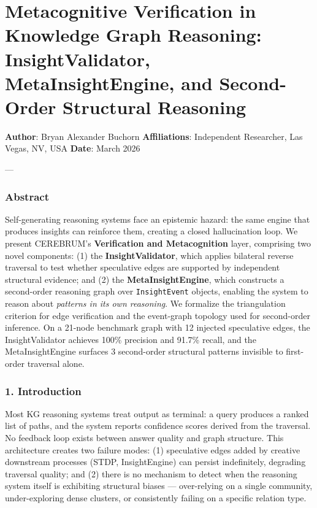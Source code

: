 \section{Metaco\-gnitive Verifi\-cation in Knowledge Graph Reasoning: InsightValidator, MetaInsightEngine, and Second-Order Structural Reasoning}

\textbf{Author}: Bryan Alexander Buchorn
\textbf{Affili\-ations}: Independent Researcher, Las Vegas, NV, USA
\textbf{Date}: March 2026

---

\subsubsection{Abstract}
Self-generating reasoning systems face an epistemic hazard: the same engine that produces insights can reinforce them, creating a closed hallu\-cination loop. We present CEREBRUM's \textbf{Verifi\-cation and Metaco\-gnition} layer, comprising two novel components: (1) the \textbf{InsightValidator}, which applies bilateral reverse traversal to test whether speculative edges are supported by independent structural evidence; and (2) the \textbf{MetaInsightEngine}, which constructs a second-order reasoning graph over \texttt{InsightEvent} objects, enabling the system to reason about \textit{patterns in its own reasoning}. We formalize the trian\-gulation criterion for edge verif\-ication and the event-graph topology used for second-order inference. On a 21-node benchmark graph with 12 injected speculative edges, the InsightValidator achieves 100\% precision and 91.7\% recall, and the MetaInsightEngine surfaces 3 second-order structural patterns invisible to first-order traversal alone.

\subsubsection{1. Introd\-uction}
Most KG reasoning systems treat output as terminal: a query produces a ranked list of paths, and the system reports confidence scores derived from the traversal. No feedback loop exists between answer quality and graph structure. This archi\-tecture creates two failure modes: (1) speculative edges added by creative downstream processes (STDP, InsightEngine) can persist indef\-initely, degrading traversal quality; and (2) there is no mechanism to detect when the reasoning system itself is exhibiting structural biases — over-relying on a single community, under-exploring dense clusters, or consi\-stently failing on a specific relation type.

